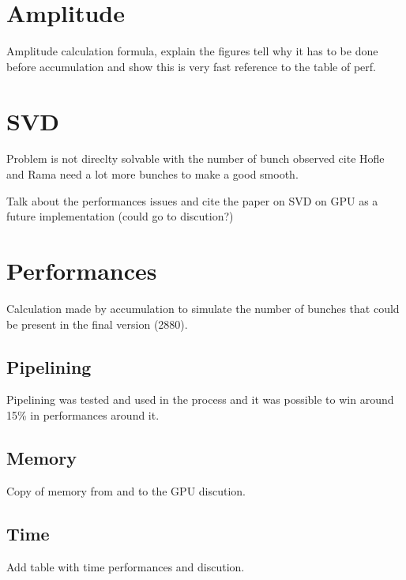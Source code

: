 \section{Amplitude}

Amplitude calculation formula, explain the figures tell why it has to be done before accumulation and show this is very fast reference to the table of perf.

\section{SVD}

Problem is not direclty solvable with the number of bunch observed cite Hofle and Rama need a lot more bunches to make a good smooth\cite{calaga06}. 

Talk about the performances issues and cite the paper on SVD on GPU as a future implementation (could go to discution?)

\section{Performances}

Calculation made by accumulation to simulate the number of bunches that could be present in the final version (2880).

   \subsection{Pipelining}

	Pipelining was tested and used in the process and it was possible to win around 15\% in performances around it.

   \subsection{Memory}

	Copy of memory from and to the GPU discution.

   \subsection{Time}

	Add table with time performances and discution.